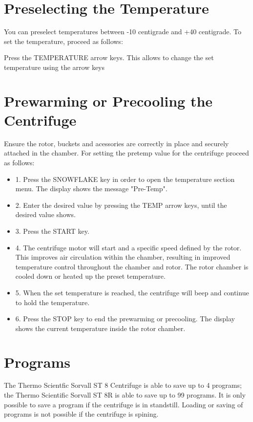 \documentclass[12pt]{../SOP3_beta}
\begin{document}
\section{Preselecting the Temperature}

\NP You can preselect temperatures between -10 centigrade and +40 centigrade. To set the temperature, proceed as follows:

\NP Press the TEMPERATURE arrow keys. This allows to change the set temperature using the arrow keys 

\section{Prewarming or Precooling the Centrifuge}

\NP Ensure the rotor, buckets and acessories are correctly in place and securely attached in the chamber. For setting the pretemp value for the centrifuge proceed as follows: 

\begin{itemize}
  \item 1. Press the SNOWFLAKE key in order to open the temperature section menu. The display shows the message "Pre-Temp".
  \item 2. Enter the desired value by pressing the TEMP arrow keys, until the desired value shows.
  \item 3. Press the START key.
  \item 4. The centrifuge motor will start and a specific speed defined by the rotor. This improves air circulation within the chamber, resulting in improved temperature control throughout the chamber and rotor. The rotor chamber is cooled down or heated up the preset temperature. 
  \item 5. When the set temperature is reached, the centrifuge will beep and continue to hold the temperature.  
  \item 6. Press the STOP key to end the prewarming or precooling. The display shows the current temperature inside the rotor chamber. 
\end{itemize}

\section{Programs}

\NP The Thermo Scientfic Sorvall ST 8 Centrifuge is able to save up to 4 programs; the Thermo Scientific Sorvall ST 8R is able to save up to 99 programs. It is only possible to save a program if the centrifuge is in standstill. Loading or saving of programs is not possible if the centrifuge is spining. 
\end{document}

